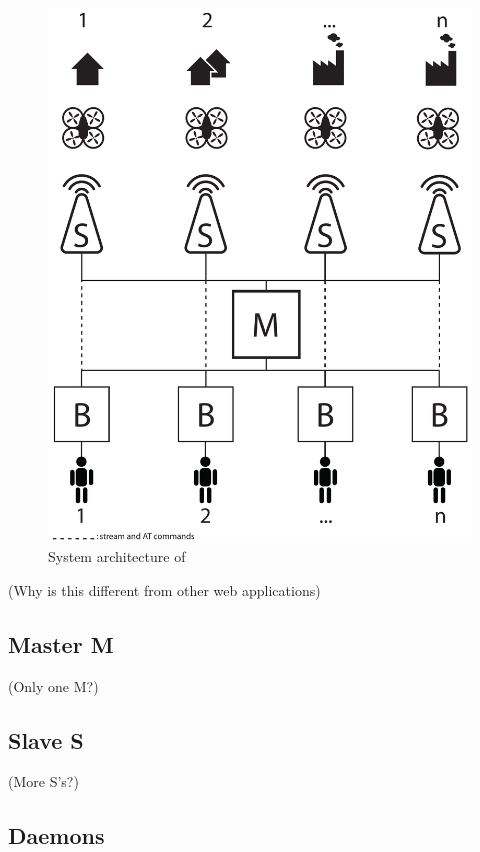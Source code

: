 \begin{figure}[htb]
    \centering 
    \includegraphics[width=\textwidth]{gfx/system_architecture.pdf}
    \caption{System architecture of \projectname{}}
    \label{fig:system_architecture}
\end{figure}


(Why is this different from other web applications)

\subsection{Master M}

(Only one M?)

\subsection{Slave S}

(More S's?)

\subsection{Daemons}

